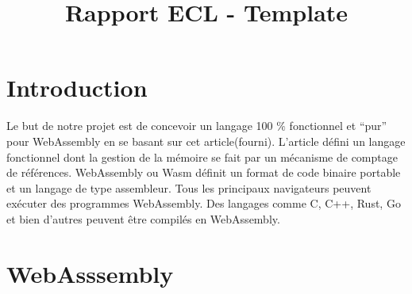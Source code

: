 \documentclass{rapportECL}
\title{Rapport ECL - Template} %
\begin{document}





\fairemarges %
\fairepagedegarde %
\tabledematieres %

\section{Introduction}
Le but de notre projet est de concevoir un langage 100 $\%$ fonctionnel et “pur” pour WebAssembly en 
se basant sur cet article\cite{ullrich_counting_2020}(fourni). L'article défini un langage fonctionnel dont la gestion de la mémoire se fait par 
un mécanisme de comptage de références.
WebAssembly\cite{noauthor_webassembly_nodate} ou Wasm définit un format de code binaire portable
et un langage de type assembleur\cite{noauthor_webassembly_2023}. Tous les principaux navigateurs peuvent exécuter des programmes WebAssembly. 
Des langages comme C, C++, Rust, Go et bien d'autres peuvent être compilés en WebAssembly. 

\section{WebAsssembly}
\end{document}
